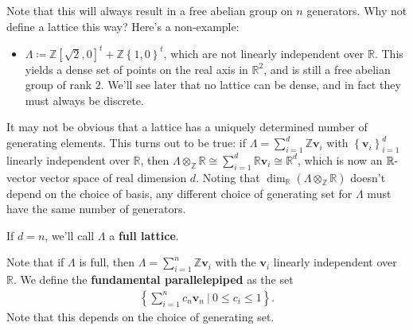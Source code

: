 \begin{example}[$n=2$]
Note that this will always result in a free abelian group on \(n\)
generators. Why not define a lattice this way? Here's a non-example:

\begin{itemize}
\tightlist
\item
  \(\Lambda \coloneqq{\mathbb{Z}}{\left[ {\sqrt{2} , 0} \right]}^t + {\mathbb{Z}}\left\{{1, 0}\right\}^t\),
  which are not linearly independent over \({\mathbb{R}}\). This yields
  a dense set of points on the real axis in \({\mathbb{R}}^2\), and is
  still a free abelian group of rank 2. We'll see later that no lattice
  can be dense, and in fact they must always be discrete.
\end{itemize}

\end{example}

\begin{remark}

It may not be obvious that a lattice has a uniquely determined number of
generating elements. This turns out to be true: if
\(\Lambda = \sum_{i=1}^d {\mathbb{Z}}\mathbf{v}_i\) with
\(\left\{{ \mathbf{v}_i }\right\}_{i=1}^d\) linearly independent over
\({\mathbb{R}}\), then
\(\Lambda\otimes_{\mathbb{Z}}{\mathbb{R}}\cong \sum_{i=1}^d {\mathbb{R}}\mathbf{v}_i \cong {\mathbb{R}}^d\),
which is now an \({\mathbb{R}}{\hbox{-}}\)vector vector space of real
dimension \(d\). Noting that
\(\dim_{\mathbb{R}}(\Lambda\otimes_{\mathbb{Z}}{\mathbb{R}})\) doesn't
depend on the choice of basis, any different choice of generating set
for \(\Lambda\) must have the same number of generators.

\end{remark}

\begin{definition}

If \(d=n\), we'll call \(\Lambda\) a \textbf{full lattice}.

\end{definition}

\begin{definition}

Note that if \(\Lambda\) is full, then
\(\Lambda= \sum_{i=1}^n {\mathbb{Z}}\mathbf{v}_i\) with the
\(\mathbf{v}_i\) linearly independent over \({\mathbb{R}}\). We define
the \textbf{fundamental parallelepiped} as the set
\begin{align*}
\left\{{ \sum_{i=1}^n c_n \mathbf{v}_n {~\mathrel{\Big|}~}0 \leq c_i \leq 1}\right\} 
.\end{align*}
Note that this depends on the choice of generating set.

\end{definition}

